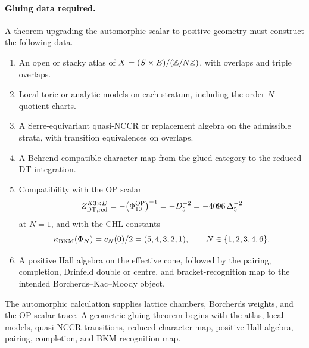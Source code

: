 \paragraph{Gluing data required.}
A theorem upgrading the automorphic scalar to positive geometry must
construct the following data.
\begin{enumerate}
\item An open or stacky atlas of $X=(S\times E)/(\mathbb{Z}/N\mathbb{Z})$, with
overlaps and triple overlaps.
\item Local toric or analytic models on each stratum, including the
order-$N$ quotient charts.
\item A Serre-equivariant quasi-NCCR or replacement algebra on the
admissible strata, with transition equivalences on overlaps.
\item A Behrend-compatible character map from the glued category to the
reduced DT integration.
\item Compatibility with the OP scalar
\[
Z^{K3\times E}_{\mathrm{DT},\mathrm{red}}
=-\bigl(\Phi_{10}^{\mathrm{OP}}\bigr)^{-1}
=-D_5^{-2}
=-4096\,\Delta_5^{-2}
\]
at $N=1$, and with the CHL constants
\[
\kappa_{\mathrm{BKM}}(\Phi_N)=c_N(0)/2=(5,4,3,2,1),
\qquad N\in\{1,2,3,4,6\}.
\]
\item A positive Hall algebra on the effective cone, followed by the
pairing, completion, Drinfeld double or centre, and bracket-recognition
map to the intended Borcherds--Kac--Moody object.
\end{enumerate}

The automorphic calculation supplies lattice chambers, Borcherds
weights, and the OP scalar trace. A geometric gluing theorem begins
with the atlas, local models, quasi-NCCR transitions, reduced character
map, positive Hall algebra, pairing, completion, and BKM recognition
map.
